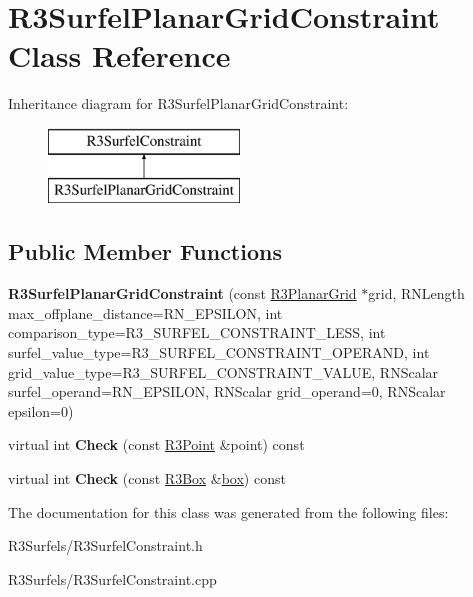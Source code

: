 \hypertarget{class_r3_surfel_planar_grid_constraint}{}\section{R3\+Surfel\+Planar\+Grid\+Constraint Class Reference}
\label{class_r3_surfel_planar_grid_constraint}
Inheritance diagram for R3\+Surfel\+Planar\+Grid\+Constraint\+:\begin{figure}[H]
\begin{center}
\leavevmode
\includegraphics[height=2.000000cm]{class_r3_surfel_planar_grid_constraint}
\end{center}
\end{figure}
\subsection*{Public Member Functions}
\begin{DoxyCompactItemize}
\item 
{\bfseries R3\+Surfel\+Planar\+Grid\+Constraint} (const \hyperlink{class_r3_planar_grid}{R3\+Planar\+Grid} $\ast$grid, R\+N\+Length max\+\_\+offplane\+\_\+distance=R\+N\+\_\+\+E\+P\+S\+I\+L\+ON, int comparison\+\_\+type=R3\+\_\+\+S\+U\+R\+F\+E\+L\+\_\+\+C\+O\+N\+S\+T\+R\+A\+I\+N\+T\+\_\+\+L\+E\+SS, int surfel\+\_\+value\+\_\+type=R3\+\_\+\+S\+U\+R\+F\+E\+L\+\_\+\+C\+O\+N\+S\+T\+R\+A\+I\+N\+T\+\_\+\+O\+P\+E\+R\+A\+ND, int grid\+\_\+value\+\_\+type=R3\+\_\+\+S\+U\+R\+F\+E\+L\+\_\+\+C\+O\+N\+S\+T\+R\+A\+I\+N\+T\+\_\+\+V\+A\+L\+UE, R\+N\+Scalar surfel\+\_\+operand=R\+N\+\_\+\+E\+P\+S\+I\+L\+ON, R\+N\+Scalar grid\+\_\+operand=0, R\+N\+Scalar epsilon=0)\hypertarget{class_r3_surfel_planar_grid_constraint_a296708293604a4ecaca4e337cabb8b29}{}\label{class_r3_surfel_planar_grid_constraint_a296708293604a4ecaca4e337cabb8b29}

\item 
virtual int {\bfseries Check} (const \hyperlink{class_r3_point}{R3\+Point} \&point) const \hypertarget{class_r3_surfel_planar_grid_constraint_a6c9e82dfe4554d856f242fff3ebee09e}{}\label{class_r3_surfel_planar_grid_constraint_a6c9e82dfe4554d856f242fff3ebee09e}

\item 
virtual int {\bfseries Check} (const \hyperlink{class_r3_box}{R3\+Box} \&\hyperlink{structbox}{box}) const \hypertarget{class_r3_surfel_planar_grid_constraint_aec462c54ffecca5795a538047665e82e}{}\label{class_r3_surfel_planar_grid_constraint_aec462c54ffecca5795a538047665e82e}

\end{DoxyCompactItemize}


The documentation for this class was generated from the following files\+:\begin{DoxyCompactItemize}
\item 
R3\+Surfels/R3\+Surfel\+Constraint.\+h\item 
R3\+Surfels/R3\+Surfel\+Constraint.\+cpp\end{DoxyCompactItemize}
